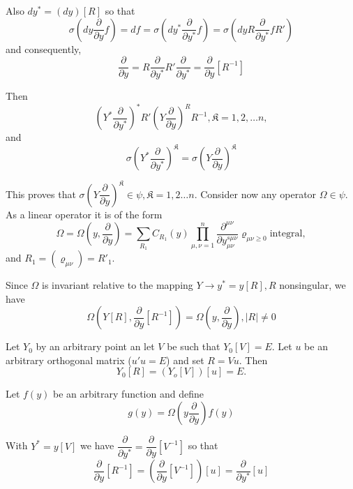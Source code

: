 Also $d y^* = (dy) [R]$ so that
$$
 \sigma (d y \frac{\partial}{\partial y} f) = df =  \sigma (d y^*
 \frac{\partial}{\partial y^*} f) =  \sigma (d y  R
 \frac{\partial}{\partial y^*} fR') 
$$
and consequently,
$$
\frac{\partial}{\partial y} =  R \frac{\partial}{\partial y^*} R'
\frac{\partial}{\partial y^*} = \frac{\partial}{\partial y} [R^{-1}] 
$$

Then 
\begin{equation*}
( Y^* \frac{\partial}{\partial y^*})^* R' (Y \frac{\partial}{\partial
    y})^R R^{-1}, \mathfrak{K} = 1,2,\ldots n, \tag{353}\label{eq353}  
\end{equation*}
and\pageoriginale
\begin{equation*}
\sigma (Y^* \frac{\partial}{\partial y^*})^\mathfrak{K} = \sigma (Y
\frac{\partial}{\partial y})^{\mathfrak{K}} \tag{354}\label{eq354}  
\end{equation*}

This proves that $\sigma ( Y \dfrac{\partial}{\partial y})^\mathfrak{K}
\in \psi, \mathfrak{K} = 1,2 \ldots n$. Consider now any
operator $\Omega \in \psi$. As a linear operator it is of the
form 
$$
\Omega = \Omega (y , \frac{\partial}{\partial y}) = \sum_{R_1} C_{R_1}
(y) \prod^n_{\mu , \nu = 1} \frac{\partial^{\mu \nu}}{\partial y^{s
    \mu \nu}_{\mu \nu}} \varrho_{\mu \nu \geq 0}\text{integral}, 
$$
and $R_1 = (\varrho_{\mu \nu}) = R'_1$.

Since $\Omega$ is invariant relative to the mapping $Y \rightarrow y^*
= y [R], R$ nonsingular, we have  
\begin{equation*}
\Omega (Y[R], \frac{\partial}{\partial y} [R^{-1}]) = \Omega (y,
\frac{\partial}{\partial y}), |R| \neq 0 \tag{355}\label{eq355}  
\end{equation*}

Let $Y_0$ by an arbitrary point an let $V$ be such that $Y_0 [V] =
E$. Let $u$ be an arbitrary orthogonal matrix ($u' u = E$) and set $R
= V u$. Then 
\begin{equation*}
Y_0 [R] = (Y_o[V]) [u] = E .\tag{356}\label{eq356}
\end{equation*}

Let $f(y)$ be an arbitrary function and define 
\begin{equation*}
g (y) = \Omega (y \frac{\partial}{\partial y}) f (y) \tag{357}\label{eq357}
\end{equation*}

With $Y^* = y[V]$ we have $\dfrac{\partial}{\partial y^*} =
\dfrac{\partial}{\partial y} [V^{-1}]$ so that  
$$
\frac{\partial}{\partial y} [R^{-1}] = (\frac{\partial}{\partial
  y}[V^{-1}]) [u] = \frac{\partial}{\partial y^*} [u] 
$$

